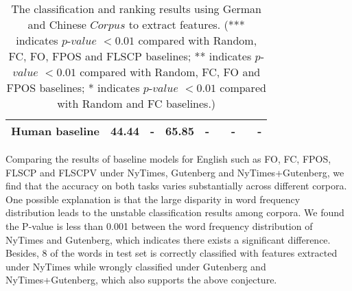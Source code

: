 \begin{table}[ht]
\begin{center}
\begin{tabular}{lcccccccc}
			\midrule
			\textbf{Human baseline}&44.44 &-&65.85 &-&&-&&-\\
			\bottomrule[1pt]
		\end{tabular}
	\end{center}
	\caption{\label{tab:resultsGerman} 
		The classification and ranking results using German and Chinese $Corpus$ to extract features.
		(*** indicates $p$-$value$ $<0.01$ compared with Random, FC, FO, FPOS and FLSCP baselines;
		** indicates $p$-$value$ $<0.01$ compared with Random, FC, FO and FPOS baselines;
		* indicates $p$-$value$ $<0.01$ compared with Random and FC baselines.)
		}
\end{table}
	

Comparing the results of baseline models for English such as FO, FC, FPOS, FLSCP and FLSCPV under NyTimes, Gutenberg and NyTimes+Gutenberg,
we find that the accuracy on both tasks varies substantially across different corpora.
One possible explanation is that the large disparity in word frequency distribution leads to the unstable classification results among corpora. 
We found the P-value is less than 0.001 between the word frequency distribution of 
NyTimes and Gutenberg, which indicates there exists a significant difference.
Besides, 8 of the words in test set is correctly classified with features extracted under NyTimes while wrongly classified under Gutenberg and NyTimes+Gutenberg, which also supports the above conjecture.

